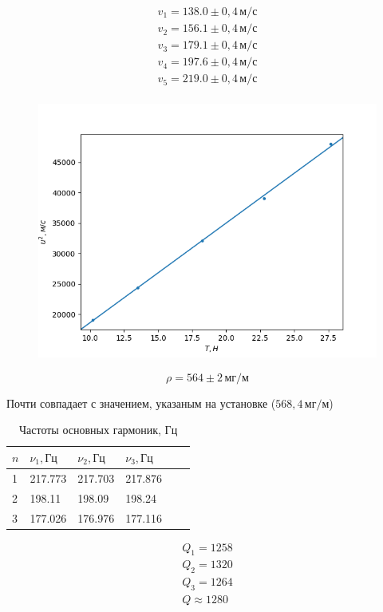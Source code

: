\begin{gather*}
    v_1=138.0\pm0{,}4\,\text{м}/\text{с}\\
    v_2=156.1\pm0{,}4\,\text{м}/\text{с}\\
    v_3=179.1\pm0{,}4\,\text{м}/\text{с}\\
    v_4=197.6\pm0{,}4\,\text{м}/\text{с}\\
    v_5=219.0\pm0{,}4\,\text{м}/\text{с}\\
\end{gather*}

\begin{figure}[ht!]
    \centering\includegraphics[width=0.8\linewidth]{img/plt2.png}
\end{figure}

\[\rho = 564\pm 2\,\text{мг}/\text{м}\]

Почти совпадает с значением, указаным на установке ($568{,}4\,\text{мг}/\text{м}$)

\begin{table}[!ht]
    \centering
    \caption{Частоты основных гармоник, Гц}
    \begin{tabular}{|l|l|l|l|l|l|}
    \hline
        $n$ & $\nu_1,\text{Гц}$ & $\nu_2,\text{Гц}$ & $\nu_3,\text{Гц}$ \\ \hline
        1 & 217.773 & 217.703 & 217.876 \\ \hline
        2 & 198.11 & 198.09 & 198.24 \\ \hline
        3 & 177.026 & 176.976 & 177.116 \\ \hline
    \end{tabular}
\end{table}

\begin{gather*}
    Q_1=1258\\
    Q_2=1320\\
    Q_3=1264\\
    Q\approx 1280
\end{gather*}


